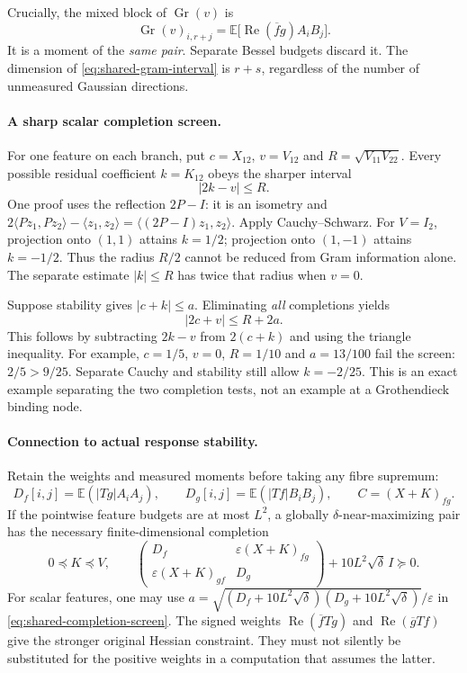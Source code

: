 Crucially, the mixed block of $\operatorname{Gr}(v)$ is
\[
 \operatorname{Gr}(v)_{i,r+j}
   =\mathbb E\bigl[\operatorname{Re}(\overline f g)A_iB_j\bigr].
\]
It is a moment of the \emph{same pair}. Separate Bessel budgets discard it.
The dimension of \eqref{eq:shared-gram-interval} is $r+s$, regardless of the
number of unmeasured Gaussian directions.

\paragraph{A sharp scalar completion screen.}
For one feature on each branch, put $c=X_{12}$,
$v=V_{12}$ and $R=\sqrt{V_{11}V_{22}}$. Every possible residual coefficient
$k=K_{12}$ obeys the sharper interval
\begin{equation}\label{eq:shared-cross-interval}
 \boxed{|2k-v|\le R.}
\end{equation}
One proof uses the reflection $2P-I$: it is an isometry and
$2\langle Pz_1,Pz_2\rangle-\langle z_1,z_2\rangle
=\langle(2P-I)z_1,z_2\rangle$. Apply Cauchy--Schwarz.
For $V=I_2$, projection onto $(1,1)$ attains $k=1/2$; projection onto
$(1,-1)$ attains $k=-1/2$. Thus the radius $R/2$ cannot be reduced from
Gram information alone. The separate estimate $|k|\le R$ has twice that radius
when $v=0$.

Suppose stability gives $|c+k|\le a$. Eliminating \emph{all} completions yields
\begin{equation}\label{eq:shared-completion-screen}
 \boxed{|2c+v|\le R+2a.}
\end{equation}
This follows by subtracting $2k-v$ from $2(c+k)$ and using the triangle
inequality. For example, $c=1/5$, $v=0$, $R=1/10$ and $a=13/100$ fail
the screen: $2/5>9/25$. Separate Cauchy and stability still allow $k=-2/25$.
This is an exact example separating the two completion tests, not an example
at a Grothendieck binding node.

\paragraph{Connection to actual response stability.}
Retain the weights and measured moments before taking any fibre supremum:
\[
 D_f[i,j]=\mathbb E(|Tg|A_iA_j),\qquad
 D_g[i,j]=\mathbb E(|Tf|B_iB_j),\qquad
 C=(X+K)_{fg}.
\]
If the pointwise feature budgets are at most $L^2$, a globally
$\delta$-near-maximizing pair has the necessary finite-dimensional completion
\begin{equation}\label{eq:shared-stability-completion}
 0\preceq K\preceq V,\qquad
 \begin{pmatrix}D_f&\varepsilon(X+K)_{fg}\\
 \varepsilon(X+K)_{gf}&D_g\end{pmatrix}
       +10L^2\sqrt\delta\,I\succeq0.
\end{equation}
For scalar features, one may use
$a=\sqrt{(D_f+10L^2\sqrt\delta)(D_g+10L^2\sqrt\delta)}/\varepsilon$
in \eqref{eq:shared-completion-screen}. The signed weights
$\operatorname{Re}(\overline f Tg)$ and
$\operatorname{Re}(\overline g Tf)$ give the stronger original Hessian
constraint. They must not silently be substituted for the positive weights
in a computation that assumes the latter.

